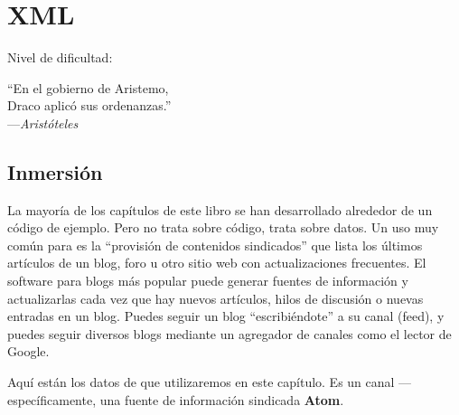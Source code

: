
\chapter{XML}\label{ch:xml}

\noindent
Nivel de dificultad:\difllll

\begin{citaCap}
``En el gobierno de Aristemo, \\
Draco aplicó sus ordenanzas.'' \\
---\emph{Aristóteles}
\end{citaCap}

\section{Inmersión}

La mayoría de los capítulos de este libro se han desarrollado alrededor de un código de ejemplo. Pero  no trata sobre código, trata sobre datos. Un uso muy común para  es la ``provisión de contenidos sindicados'' que lista los últimos artículos de un blog, foro u otro sitio web con actualizaciones frecuentes. El software para blogs más popular puede generar fuentes de información y actualizarlas cada vez que hay nuevos artículos, hilos de discusión o nuevas entradas en un blog. Puedes seguir un blog ``escribiéndote'' a su canal (feed), y puedes seguir diversos blogs mediante un agregador de canales como el lector de Google.

Aquí están los datos de  que utilizaremos en este capítulo. Es un canal ---específicamente, una fuente de información sindicada \textbf{Atom}.

